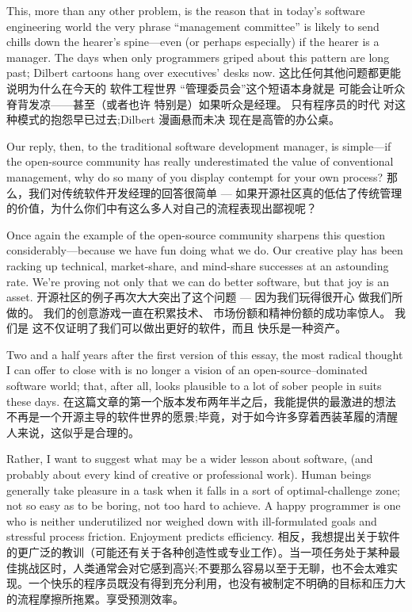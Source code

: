 \documentclass[a4paper,12pt,UTF8,twoside]{ctexbook}
\begin{document}
This, more than any other problem, is the reason that in today's software engineering world the very phrase ``management committee'' is likely to send chills down the hearer's spine—even (or perhaps especially) if the hearer is a manager. The days when only programmers griped about this pattern are long past; Dilbert cartoons hang over executives' desks now.
这比任何其他问题都更能说明为什么在今天的 软件工程世界 “管理委员会”这个短语本身就是 可能会让听众脊背发凉——甚至（或者也许 特别是）如果听众是经理。 只有程序员的时代 对这种模式的抱怨早已过去;Dilbert 漫画悬而未决 现在是高管的办公桌。

Our reply, then, to the traditional software development manager, is simple—if the open-source community has really underestimated the value of conventional management, why do so many of you display contempt for your own process?
那么，我们对传统软件开发经理的回答很简单 — 如果开源社区真的低估了传统管理的价值，为什么你们中有这么多人对自己的流程表现出鄙视呢？

Once again the example of the open-source community sharpens this question considerably—because we have fun doing what we do. Our creative play has been racking up technical, market-share, and mind-share successes at an astounding rate. We're proving not only that we can do better software, but that joy is an asset.
开源社区的例子再次大大突出了这个问题 — 因为我们玩得很开心 做我们所做的。 我们的创意游戏一直在积累技术、 市场份额和精神份额的成功率惊人。 我们是 这不仅证明了我们可以做出更好的软件，而且 快乐是一种资产。

Two and a half years after the first version of this essay, the most radical thought I can offer to close with is no longer a vision of an open-source–dominated software world; that, after all, looks plausible to a lot of sober people in suits these days.
在这篇文章的第一个版本发布两年半之后，我能提供的最激进的想法不再是一个开源主导的软件世界的愿景;毕竟，对于如今许多穿着西装革履的清醒人来说，这似乎是合理的。

Rather, I want to suggest what may be a wider lesson about software, (and probably about every kind of creative or professional work). Human beings generally take pleasure in a task when it falls in a sort of optimal-challenge zone; not so easy as to be boring, not too hard to achieve. A happy programmer is one who is neither underutilized nor weighed down with ill-formulated goals and stressful process friction. Enjoyment predicts efficiency.
相反，我想提出关于软件的更广泛的教训（可能还有关于各种创造性或专业工作）。当一项任务处于某种最佳挑战区时，人类通常会对它感到高兴;不要那么容易以至于无聊，也不会太难实现。一个快乐的程序员既没有得到充分利用，也没有被制定不明确的目标和压力大的流程摩擦所拖累。享受预测效率。
\end{document}
